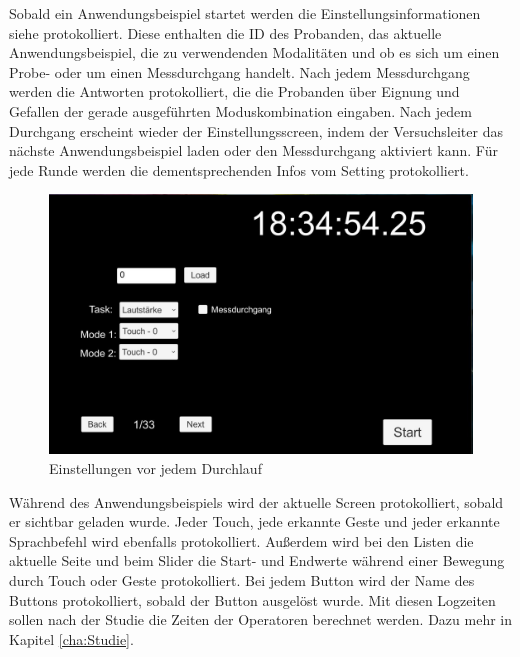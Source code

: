Sobald ein Anwendungsbeispiel startet werden die Einstellungsinformationen siehe  protokolliert. 
Diese enthalten die ID des Probanden, das aktuelle Anwendungsbeispiel, die zu verwendenden Modalitäten und ob es sich um einen Probe- oder um einen Messdurchgang handelt. 
Nach jedem Messdurchgang werden die Antworten protokolliert, die die Probanden über Eignung und Gefallen der gerade ausgeführten Moduskombination eingaben. 
Nach jedem Durchgang erscheint wieder der Einstellungsscreen, indem der Versuchsleiter das nächste Anwendungsbeispiel laden oder den Messdurchgang aktiviert kann. 
Für jede Runde werden die dementsprechenden Infos vom Setting protokolliert.
\begin{figure}[ht]
  \centering
  \includegraphics[width=1\textwidth]{img/SettingsPrototyp.jpg}
  \caption{Einstellungen vor jedem Durchlauf}
  \label{fig:ProbandenSettings}
\end{figure} 

Während des Anwendungsbeispiels wird der aktuelle Screen protokolliert, sobald er sichtbar geladen wurde. 
Jeder Touch, jede erkannte Geste und jeder erkannte Sprachbefehl wird ebenfalls protokolliert. 
Außerdem wird bei den Listen die aktuelle Seite und beim Slider die Start- und Endwerte während einer Bewegung durch Touch oder Geste protokolliert. 
Bei jedem Button wird der Name des Buttons protokolliert, sobald der Button ausgelöst wurde. 
Mit diesen Logzeiten sollen nach der Studie die Zeiten der Operatoren berechnet werden. 
Dazu mehr in Kapitel \ref{cha:Studie}.  